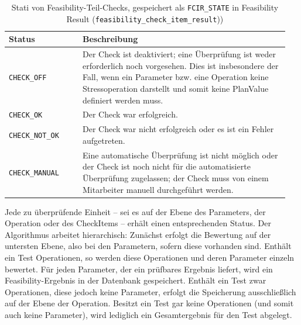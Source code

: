 \begin{table}[htbp]
    \centering
    \footnotesize
    \renewcommand{\arraystretch}{1.3} %
    \begin{tabular}{p{0.25\linewidth} p{0.7\linewidth}}
        \toprule
        \textbf{Status} & \textbf{Beschreibung} \\
        \midrule
        \texttt{CHECK\_OFF} & Der Check ist deaktiviert; eine Überprüfung ist weder erforderlich noch vorgesehen. Dies ist insbesondere der Fall, wenn ein Parameter bzw. eine Operation keine Stressoperation darstellt und somit keine PlanValue definiert werden muss. \\
        \midrule
        \texttt{CHECK\_OK} & Der Check war erfolgreich. \\
        \midrule
        \texttt{CHECK\_NOT\_OK} & Der Check war nicht erfolgreich oder es ist ein Fehler aufgetreten. \\
        \midrule
        \texttt{CHECK\_MANUAL} & Eine automatische Überprüfung ist nicht möglich oder der Check ist noch nicht für die automatisierte Überprüfung zugelassen; der Check muss von einem Mitarbeiter manuell durchgeführt werden. \\
        \bottomrule
    \end{tabular}
    \caption{Stati von Feasibility-Teil-Checks, gespeichert als \texttt{FCIR\_STATE} in Feasibility Result (\texttt{feasibility\_check\_item\_result}))}
    \label{tab:feasibility-states}
\end{table}

Jede zu überprüfende Einheit – sei es auf der Ebene des Parameters, der Operation oder des CheckItems – erhält einen entsprechenden Status. Der Algorithmus arbeitet hierarchisch: Zunächst erfolgt die Bewertung auf der untersten Ebene, also bei den Parametern, sofern diese vorhanden sind. Enthält ein Test Operationen, so werden diese Operationen und deren Parameter einzeln bewertet. Für jeden Parameter, der ein prüfbares Ergebnis liefert, wird ein Feasibility-Ergebnis in der Datenbank gespeichert. Enthält ein Test zwar Operationen, diese jedoch keine Parameter, erfolgt die Speicherung ausschließlich auf der Ebene der Operation. Besitzt ein Test gar keine Operationen (und somit auch keine Parameter), wird lediglich ein Gesamtergebnis für den Test abgelegt.

